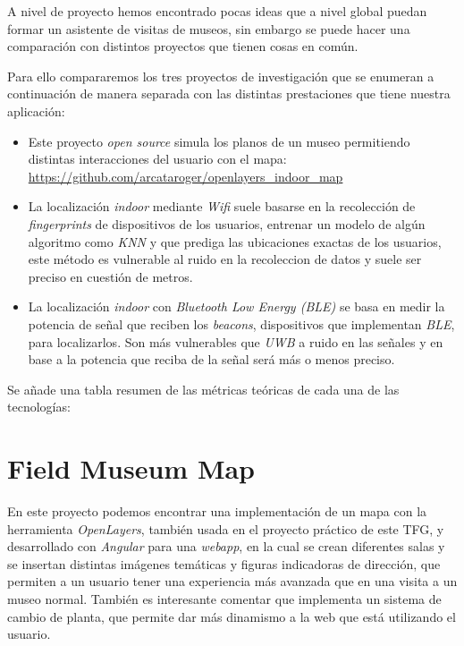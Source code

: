 A nivel de proyecto hemos encontrado pocas ideas que a nivel global puedan formar un asistente de visitas de museos, sin embargo se puede hacer una comparación con distintos proyectos que tienen cosas en común.

Para ello compararemos los tres proyectos de investigación que se enumeran a continuación de manera separada con las distintas prestaciones que tiene nuestra aplicación:
\begin{itemize}
    \item Este proyecto \textit{open source} simula los planos de un museo permitiendo distintas interacciones del usuario con el mapa: \url{https://github.com/arcataroger/openlayers_indoor_map}
    \item La localización \textit{indoor} mediante \textit{Wifi} suele basarse en la recolección de \textit{fingerprints} de dispositivos de los usuarios, entrenar un modelo de algún algoritmo como \textit{KNN} y que prediga las ubicaciones exactas de los usuarios, este método es vulnerable al ruido en la recoleccion de datos y suele ser preciso en cuestión de metros.\cite{wifiIndoor}
    \item La localización \textit{indoor} con \textit{Bluetooth Low Energy (BLE)} se basa en medir la potencia de señal que reciben los \textit{beacons}, dispositivos que implementan \textit{BLE}, para localizarlos. Son más vulnerables que \textit{UWB} a ruido en las señales y en base a la potencia que reciba de la señal será más o menos preciso.
\end{itemize}

Se añade una tabla resumen de las métricas teóricas de cada una de las tecnologías\cite{comparacionIndoor}:
\FloatBarrier
{}
\FloatBarrier

\section{Field Museum Map}

En este proyecto podemos encontrar una implementación de un mapa con la herramienta \textit{OpenLayers}, también usada en el proyecto práctico de este TFG, y desarrollado con \textit{Angular} para una \textit{webapp}, en la cual se crean diferentes salas y se insertan distintas imágenes temáticas y figuras indicadoras de dirección, que permiten a un usuario tener una experiencia más avanzada que en una visita a un museo normal. También es interesante comentar que implementa un sistema de cambio de planta, que permite dar más dinamismo a la web que está utilizando el usuario.

